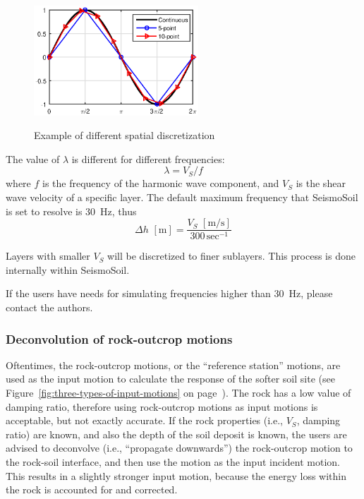 \documentclass[11pt,letterpaper]{article}
\begin{document}
\begin{figure}[h]
	\centering
	\includegraphics[width=0.55\textwidth]{spatial_discretization.eps}\\
	\caption{Example of different spatial discretization}\label{fig:spatial_discretization}
\end{figure}

The value of $ \lambda $ is different for different frequencies:
\[
\lambda = V_S/f
\]
where $ f $ is the frequency of the harmonic wave component, and $ V_S $ is the shear wave velocity of a specific layer. The default maximum frequency that SeismoSoil is set to resolve is 30~Hz, thus
\[
\Delta h \,\,[\mathrm{m}] = \frac{V_S\,\,[\mathrm{m/s}]}{300\,\mathrm{sec}^{-1}}
\]


Layers with smaller $ V_S $ will be discretized to finer sublayers. This process is done internally within SeismoSoil.

If the users have needs for simulating frequencies higher than 30~Hz, please contact the authors.




\subsubsection{Deconvolution of rock-outcrop motions}\label{sec:deconvolution}

Oftentimes, the rock-outcrop motions, or the ``reference station'' motions, are used as the input motion to calculate the response of the softer soil site (see Figure~\ref{fig:three-types-of-input-motions} on page~\pageref{fig:three-types-of-input-motions}). The rock has a low value of damping ratio, therefore using rock-outcrop motions as input motions is acceptable, but not exactly accurate. If the rock properties (i.e., $V_S$, damping ratio) are known, and also the depth of the soil deposit is known, the users are advised to deconvolve (i.e., ``propagate downwards'') the rock-outcrop motion to the rock-soil interface, and then use the motion as the input incident motion. This results in a slightly stronger input motion, because the energy loss within the rock is accounted for and corrected.
\end{document}
